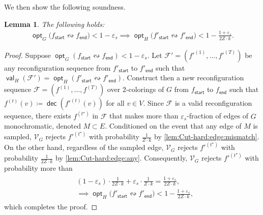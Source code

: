 \documentclass[11pt,fleqn]{article}
\renewcommand{\epsilon}{\varepsilon}
\newcommand{\reco}{\leftrightsquigarrow}
\newcommand{\defeq}{\coloneq}
\DeclareMathOperator{\val}{\mathsf{val}}
\DeclareMathOperator{\opt}{\mathsf{opt}}
\DeclareMathOperator{\dec}{\mathsf{dec}}
\newcommand{\sss}{\mathsf{start}}
\newcommand{\ttt}{\mathsf{end}}
\newcommand{\V}{\calV}
\newcommand{\f}{f}
\newcommand{\sqcol}{\scrF}
\newcommand{\calV}{\mathcal{V}}
\newcommand{\scrF}{\mathscr{F}}
\newtheorem{lemma}[theorem]{Lemma}
\theoremstyle{definition}
\numberwithin{equation}{section}
\begin{document}
We then show the following soundness.


\begin{lemma}
\label{lem:Cut-hard:sound}
    The following holds\textup{:}
    \begin{align}
        \opt_G\bigl(\f_\sss \reco \f_\ttt\bigr) < 1-\epsilon_s
        \implies \opt_H\bigl(\f'_\sss \reco \f'_\ttt\bigr) < 1 - \frac{1+\epsilon_s}{2Z \cdot k}.
    \end{align}
\end{lemma}
\begin{proof} Suppose $\opt_G(\f_\sss \reco \f_\ttt) < 1-\epsilon_s$.
Let $\sqcol' = (\f'^{(1)}, \ldots, \f'^{(T)})$
    be any reconfiguration sequence from $\f'_\sss$ to $\f'_\ttt$ such that
$\val_H(\sqcol') = \opt_H(\f'_\sss \reco \f'_\ttt)$.
Construct then
a new reconfiguration sequence
$\sqcol=(\f^{(1)}, \ldots, \f^{(T)})$
over $2$-colorings of $G$
from $\f_\sss$ to $\f_\ttt$ such that
$\f^{(t)}(v) \defeq \dec(\f'^{(t)}(v))$
for all $v \in V$.
Since $\sqcol$ is a valid reconfiguration sequence,
there exists $\f^{(t^\star)}$ in $\sqcol$ that makes more than $\epsilon_s$-fraction of edges of $G$ monochromatic,
denoted $M \subset E$.
Conditioned on the event that any edge of $M$ is sampled,
$\V_G$ rejects $\f'^{(t^\star)}$ with probability $\frac{1}{Z\cdot k}$ by \cref{lem:Cut-hard:edge:mismatch}.
On the other hand,
regardless of the sampled edge,
$\V_G$ rejects $\f'^{(t^\star)}$ with probability $\frac{1}{2Z \cdot k}$ by \cref{lem:Cut-hard:edge:any}.
Consequently, $\V_G$ rejects $\f'^{(t^\star)}$ with probability more than 
\begin{align}
\begin{aligned}
    & (1-\epsilon_s)\cdot \frac{1}{2Z \cdot k} + \epsilon_s \cdot \frac{1}{Z\cdot k}
    = \frac{1+\epsilon_s}{2Z \cdot k}, \\
    & \implies \opt_H\bigl(\f'_\sss \reco \f'_\ttt\bigr) < 1-\frac{1+\epsilon_s}{2Z \cdot k},
\end{aligned}
\end{align}
which completes the proof.
\end{proof}
\end{document}

